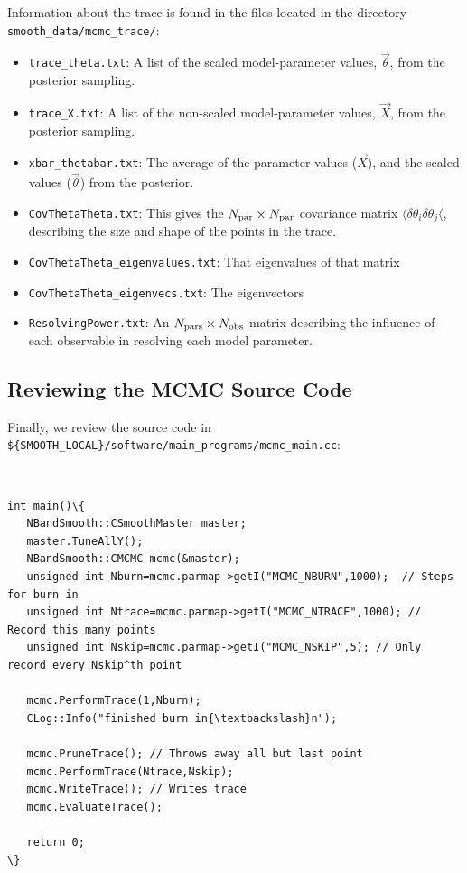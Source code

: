 \documentclass[UserManual.tex]{subfiles}
\begin{document}
Information about the trace is found in the files located in the directory {\tt smooth\_data/mcmc\_trace/}:
\begin{itemize}
\item {\tt trace\_theta.txt}: A list of the scaled model-parameter values, $\vec{\theta}$, from the posterior sampling.
\item {\tt trace\_X.txt}: A list of the non-scaled model-parameter values, $\vec{X}$, from the posterior sampling.
\item {\tt xbar\_thetabar.txt}: The average of the parameter values ($\vec{X}$), and the scaled values ($\vec{\theta}$) from the posterior.
\item {\tt CovThetaTheta.txt}: This gives the $N_{\rm par}\times N_{\rm par}$ covariance matrix $\langle\delta \theta_i\delta\theta_j\langle$, describing the size and shape of the points in the trace.
\item {\tt CovThetaTheta\_eigenvalues.txt}: That eigenvalues of that matrix
\item {\tt CovThetaTheta\_eigenvecs.txt}: The eigenvectors
\item {\tt ResolvingPower.txt}: An $N_{\rm pars}\times N_{\rm obs}$ matrix describing the influence of each observable in resolving each model parameter.
\end{itemize}

\subsection{Reviewing the MCMC Source Code}\label{sec:mcmcsource}

Finally, we review the source code in {\tt \$\{SMOOTH\_LOCAL\}/software/main\_programs/mcmc\_main.cc}:
{\tt
\begin{Verbatim}[commandchars=\\\{\}]
int main()\{
   NBandSmooth::CSmoothMaster master;
   master.TuneAllY();
   NBandSmooth::CMCMC mcmc(&master);
   unsigned int Nburn=mcmc.parmap->getI("MCMC_NBURN",1000);  // Steps for burn in
   unsigned int Ntrace=mcmc.parmap->getI("MCMC_NTRACE",1000); // Record this many points
   unsigned int Nskip=mcmc.parmap->getI("MCMC_NSKIP",5); // Only record every Nskip^th point
      
   mcmc.PerformTrace(1,Nburn);   
   CLog::Info("finished burn in{\textbackslash}n");
   
   mcmc.PruneTrace(); // Throws away all but last point
   mcmc.PerformTrace(Ntrace,Nskip);
   mcmc.WriteTrace(); // Writes trace
   mcmc.EvaluateTrace();

   return 0;
\}
\end{Verbatim}
}
\end{document}
